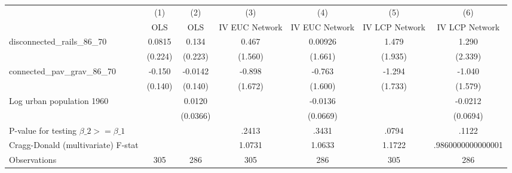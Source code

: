 {
\def\sym#1{\ifmmode^{#1}\else\(^{#1}\)\fi}
\begin{tabular}{l*{6}{c}}
\hline\hline
                &\multicolumn{1}{c}{(1)}&\multicolumn{1}{c}{(2)}&\multicolumn{1}{c}{(3)}&\multicolumn{1}{c}{(4)}&\multicolumn{1}{c}{(5)}&\multicolumn{1}{c}{(6)}\\
                &\multicolumn{1}{c}{OLS}&\multicolumn{1}{c}{OLS}&\multicolumn{1}{c}{IV EUC Network}&\multicolumn{1}{c}{IV EUC Network}&\multicolumn{1}{c}{IV LCP Network}&\multicolumn{1}{c}{IV LCP Network}\\
\hline
disconnected\_rails\_86\_70&   0.0815         &    0.134         &    0.467         &  0.00926         &    1.479         &    1.290         \\
                &  (0.224)         &  (0.223)         &  (1.560)         &  (1.661)         &  (1.935)         &  (2.339)         \\
[1em]
connected\_pav\_grav\_86\_70&   -0.150         &  -0.0142         &   -0.898         &   -0.763         &   -1.294         &   -1.040         \\
                &  (0.140)         &  (0.140)         &  (1.672)         &  (1.600)         &  (1.733)         &  (1.579)         \\
[1em]
Log urban population 1960&                  &   0.0120         &                  &  -0.0136         &                  &  -0.0212         \\
                &                  & (0.0366)         &                  & (0.0669)         &                  & (0.0694)         \\
\hline
P-value for testing $\beta\_{2} >= \beta\_{1}$&                  &                  &    .2413         &    .3431         &    .0794         &    .1122         \\
Cragg-Donald (multivariate) F-stat&                  &                  &   1.0731         &   1.0633         &   1.1722         &.9860000000000001         \\
Observations    &      305         &      286         &      305         &      286         &      305         &      286         \\
\hline\hline
\end{tabular}
}
